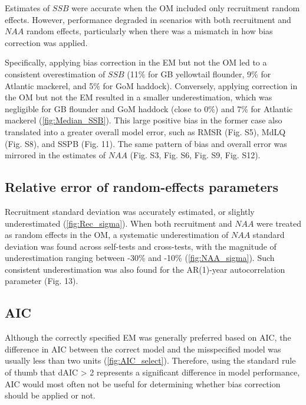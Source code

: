\documentclass[
  12pt,
]{article}
\begin{document}
Estimates of \(SSB\) were accurate when the OM included only recruitment
random effects. However, performance degraded in scenarios with both
recruitment and \(NAA\) random effects, particularly when there was a
mismatch in how bias correction was applied.

Specifically, applying bias correction in the EM but not the OM led to a
consistent overestimation of \(SSB\) (11\% for GB yellowtail flounder,
9\% for Atlantic mackerel, and 5\% for GoM haddock). Conversely,
applying correction in the OM but not the EM resulted in a smaller
underestimation, which was negligible for GB flounder and GoM haddock
(close to 0\%) and 7\% for Atlantic mackerel (\autoref{fig:Median_SSB}).
This large positive bias in the former case also translated into a
greater overall model error, such as RMSR (Fig. S5), MdLQ (Fig. S8), and
SSPB (Fig. 11). The same pattern of bias and overall error was mirrored
in the estimates of \(NAA\) (Fig. S3, Fig. S6, Fig. S9, Fig. S12).

\hypertarget{relative-error-of-random-effects-parameters}{%
\subsection{Relative error of random-effects
parameters}\label{relative-error-of-random-effects-parameters}}

Recruitment standard deviation was accurately estimated, or slightly
underestimated (\autoref{fig:Rec_sigma}). When both recruitment and
\(NAA\) were treated as random effects in the OM, a systematic
underestimation of \(NAA\) standard deviation was found across
self-tests and cross-tests, with the magnitude of underestimation
ranging between -30\% and -10\% (\autoref{fig:NAA_sigma}). Such
consistent underestimation was also found for the AR(1)-year
autocorrelation parameter (Fig. 13).

\hypertarget{aic}{%
\subsection{AIC}\label{aic}}

Although the correctly specified EM was generally preferred based on
AIC, the difference in AIC between the correct model and the
misspecified model was usually less than two units
(\autoref{fig:AIC_select}). Therefore, using the standard rule of thumb
that dAIC \textgreater{} 2 represents a significant difference in model
performance, AIC would most often not be useful for determining whether
bias correction should be applied or not.
\end{document}
